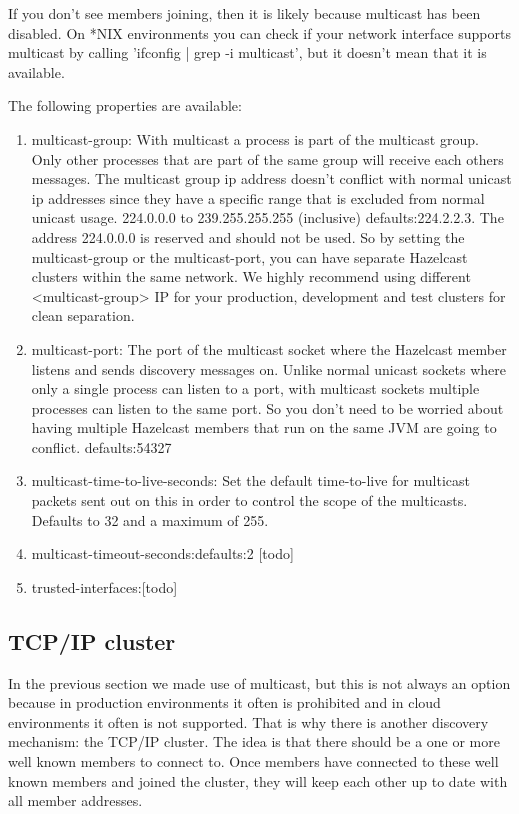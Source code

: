 If you don't see members joining, then it is likely because multicast has been disabled. On *NIX environments you can check if your network interface supports multicast by calling 'ifconfig | grep -i multicast', but it doesn't mean that it is available.

The following properties are available:
\begin{enumerate}
\item multicast-group: With multicast a process is part of the multicast group. Only other processes that are part of the same group will receive each others messages. The multicast group ip address doesn't conflict with normal unicast ip addresses since they have a specific range that is excluded from normal unicast usage. 224.0.0.0 to 239.255.255.255 (inclusive) defaults:224.2.2.3. The address 224.0.0.0 is reserved and should not be used.  So by setting the multicast-group or the multicast-port, you can have separate Hazelcast clusters within the same network. We highly recommend using different <multicast-group> IP for your production, development and test clusters for clean separation.
\item 	multicast-port: The port of the multicast socket where the Hazelcast member listens and sends discovery messages on. Unlike normal unicast sockets where only a single process can listen to a port, with multicast sockets multiple processes can listen to the same port. So you don't need to be worried about having multiple Hazelcast members that run on the same JVM are going to conflict. defaults:54327
\item multicast-time-to-live-seconds: Set the default time-to-live for multicast packets sent out on this in order to control the scope of the multicasts. Defaults to 32 and a maximum of 255.
\item multicast-timeout-seconds:defaults:2 [todo]
\item trusted-interfaces:[todo]
\end{enumerate}

\subsection{TCP/IP cluster}
In the previous section we made use of multicast, but this is not always an option because in production environments it often is prohibited and in cloud environments it often is not supported. That is why there is another discovery mechanism: the TCP/IP cluster. The idea is that there should be a one or more well known members to connect to. Once members have connected to these well known members and joined the cluster, they will keep each other up to date with all member addresses.

